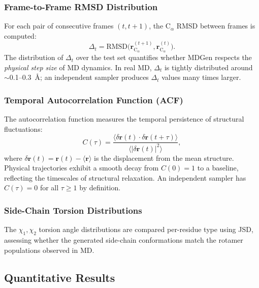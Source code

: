 \documentclass[11pt,a4paper]{article}
\begin{document}
\subsubsection{Frame-to-Frame RMSD Distribution}

For each pair of consecutive frames $(t, t+1)$, the $\text{C}_\alpha$ RMSD between frames is
computed:
\begin{equation}
  \Delta_t = \text{RMSD}\bigl(\bm{r}^{(t+1)}_{\text{C}_\alpha}, \bm{r}^{(t)}_{\text{C}_\alpha}\bigr).
  \label{eq:frame_rmsd}
\end{equation}
The distribution of $\Delta_t$ over the test set quantifies whether MDGen respects the
\emph{physical step size} of MD dynamics.  In real MD, $\Delta_t$ is tightly distributed around
$\sim$0.1--0.3~\AA; an independent sampler produces $\Delta_t$ values many times larger.

\subsubsection{Temporal Autocorrelation Function (ACF)}

The autocorrelation function measures the temporal persistence of structural fluctuations:
\begin{equation}
  C(\tau) = \frac{\langle \delta\bm{r}(t) \cdot \delta\bm{r}(t+\tau) \rangle}
                 {\langle |\delta\bm{r}(t)|^2 \rangle},
  \label{eq:acf}
\end{equation}
where $\delta\bm{r}(t) = \bm{r}(t) - \langle\bm{r}\rangle$ is the displacement from the mean
structure.  Physical trajectories exhibit a smooth decay from $C(0) = 1$ to a baseline,
reflecting the timescales of structural relaxation.  An independent sampler has $C(\tau) = 0$ for
all $\tau \geq 1$ by definition.

\subsubsection{Side-Chain Torsion Distributions}

The $\chi_1, \chi_2$ torsion angle distributions are compared per-residue type using JSD, assessing
whether the generated side-chain conformations match the rotamer populations observed in MD.

\subsection{Quantitative Results}
\end{document}
